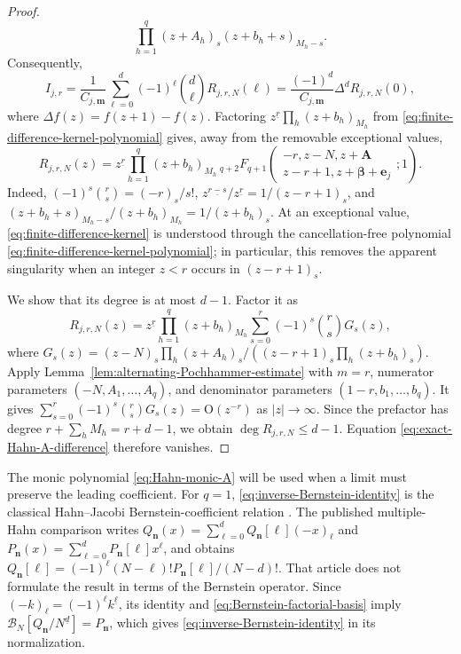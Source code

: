 \documentclass[10pt]{amsart}
\newcommand{\A}{\boldsymbol A}
\newcommand{\bbeta}{\boldsymbol\beta}
\newcommand{\mm}{\boldsymbol m}
\newcommand{\ee}{\boldsymbol e}
\newcommand{\fall}[2]{#1^{\underline{#2}}}
\newcommand{\pFq}[5]{{}_{#1}F_{#2}\!\left(\begin{matrix}#3\\#4\end{matrix};#5\right)}
\theoremstyle{plain}
\theoremstyle{definition}
\theoremstyle{remark}
\begin{document}
\begin{proof}
\begin{equation}
 \prod_{h=1}^q (z+A_h)_s(z+b_h+s)_{M_h-s}.
 \label{eq:finite-difference-kernel-polynomial}
\end{equation}
Consequently,
\begin{equation}
 I_{j,r}
 =\frac1{C_{j,\mm}}\sum_{\ell=0}^d(-1)^\ell\binom d\ell
 R_{j,r,N}(\ell)
 =\frac{(-1)^d}{C_{j,\mm}}\Delta^dR_{j,r,N}(0),
 \label{eq:exact-Hahn-A-difference}
\end{equation}
where \(\Delta f(z)=f(z+1)-f(z)\).  Factoring
\(\fall{z}{r}\prod_h(z+b_h)_{M_h}\) from
\eqref{eq:finite-difference-kernel-polynomial} gives, away from the
removable exceptional values,
\begin{equation}
 R_{j,r,N}(z)=\fall{z}{r}
 \prod_{h=1}^q(z+b_h)_{M_h}
 \,\pFq{q+2}{q+1}
 {-r,z-N,z+\A}{z-r+1,z+\bbeta+\ee_j}{1}.
 \label{eq:finite-difference-kernel}
\end{equation}
Indeed,
\((-1)^s\binom rs=(-r)_s/s!\),
\(\fall{z}{r-s}/\fall{z}{r}=1/(z-r+1)_s\), and
\((z+b_h+s)_{M_h-s}/(z+b_h)_{M_h}=1/(z+b_h)_s\).
At an exceptional value, \eqref{eq:finite-difference-kernel} is understood
through the cancellation-free polynomial
\eqref{eq:finite-difference-kernel-polynomial}; in particular, this removes
the apparent singularity when an integer \(z<r\) occurs in
\((z-r+1)_s\).

We show that its degree is at most \(d-1\). Factor it as
\[
 R_{j,r,N}(z)=\fall{z}{r}\prod_{h=1}^q(z+b_h)_{M_h}
 \sum_{s=0}^r(-1)^s\binom rsG_s(z),
\]
where \(G_s(z)=(z-N)_s\prod_h(z+A_h)_s/
((z-r+1)_s\prod_h(z+b_h)_s)\).
Apply Lemma~\ref{lem:alternating-Pochhammer-estimate} with \(m=r\), numerator
parameters \((-N,A_1,\ldots,A_q)\), and denominator parameters
\((1-r,b_1,\ldots,b_q)\). It gives
\(\sum_{s=0}^r(-1)^s\binom rsG_s(z)
=\mathrm O(z^{-r})\) as \(|z|\to\infty\).
Since the prefactor has degree
\(r+\sum_hM_h=r+d-1\), we obtain
\(\deg R_{j,r,N}\le d-1\). Equation
\eqref{eq:exact-Hahn-A-difference} therefore vanishes.
\end{proof}

The monic polynomial \eqref{eq:Hahn-monic-A} will be used when a limit
must preserve the leading coefficient.  For \(q=1\),
\eqref{eq:inverse-Bernstein-identity} is the classical Hahn--Jacobi
Bernstein-coefficient relation \cite{Ciesielski1987,Waldron2006}.  The
published multiple-Hahn comparison
\cite[Proposition~3.18]{BranquinhoDiazFoulquieManasWolfs2025} writes
\(Q_{\boldsymbol n}(x)=\sum_{\ell=0}^d
Q_{\boldsymbol n}[\ell](-x)_\ell\) and
\(P_{\boldsymbol n}(x)=\sum_{\ell=0}^d
P_{\boldsymbol n}[\ell]x^\ell\), and obtains
\(Q_{\boldsymbol n}[\ell]=(-1)^\ell
(N-\ell)!P_{\boldsymbol n}[\ell]/(N-d)!\).
That article does not formulate the result in terms of the Bernstein
operator.  Since \((-k)_\ell=(-1)^\ell\fall{k}{\ell}\), its identity and
\eqref{eq:Bernstein-factorial-basis} imply
\(\mathscr B_N[Q_{\boldsymbol n}/\fall{N}{d}]=P_{\boldsymbol n}\), which
gives \eqref{eq:inverse-Bernstein-identity} in its normalization.
\end{document}
